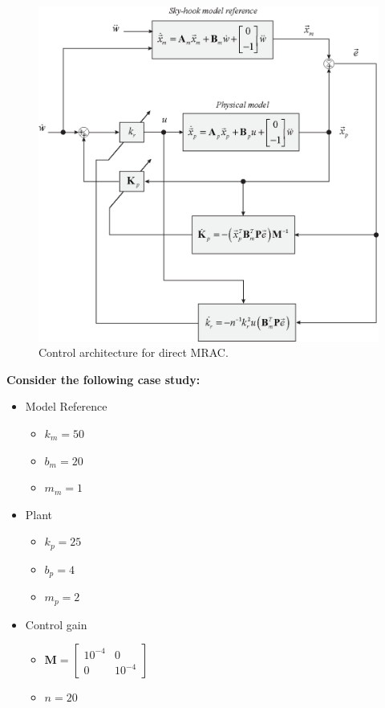 \documentclass[11pt,a4paper,oneside]{book}
\numberwithin{equation}{section}
\theoremstyle{it}
\theoremstyle{definition}
\begin{document}
\begin{figure}[H]
	\centering
	\includegraphics[width = 325pt, keepaspectratio]{figures/adaptive_control/active_suspension_ctrl.eps}
	\captionsetup{width=0.75\textwidth}		
	\caption{Control architecture for direct MRAC.}
	\label{figCtrlMRAC}
\end{figure}

\textbf{Consider the following case study:}
\begin{itemize}
	\item Model Reference
	\begin{itemize}
		\item $k_m = 50$
		\item $b_m=20$
		\item $m_m=1$
	\end{itemize}
	\item Plant 
	\begin{itemize}
		\item $k_p = 25$
		\item $b_p=4$
		\item $m_p=2$
	\end{itemize}
	\item Control gain
	\begin{itemize}
		\item $\mathbf{M} = \begin{bmatrix} 10^{-4} & 0 \\ 0 & 10^{-4} \end{bmatrix}$
		\item $n = 20$
	\end{itemize}
\end{itemize}
\end{document}
